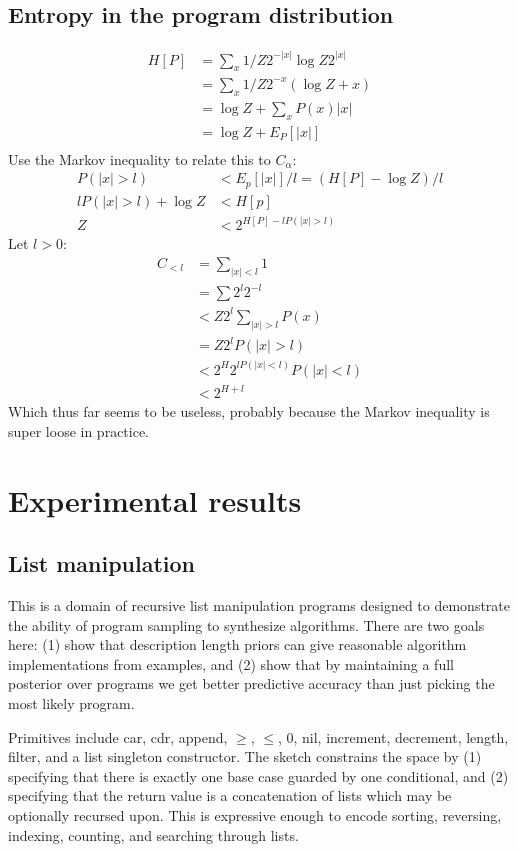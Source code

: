 \documentclass{article}
\begin{document}
\subsection{Entropy in the program distribution}
\begin{align}
  H[P] &=  \sum_x 1/Z2^{-|x|} \log Z2^{|x|}\\
  & = \sum_x 1/Z 2^{-x} (\log Z + x)\\
  & = \log Z + \sum_x P(x)|x|\\
  & = \log Z + E_P[|x|]\\
\end{align}
Use the Markov inequality to relate this to $C_\alpha$:
\begin{align}
  P(|x| > l) & < E_p[|x|]/l = (H[P] - \log Z)/l %
  \\  lP(|x| > l) + \log Z& < H[p]\\
  Z& < 2^{H[P] - lP(|x| > l)}
\end{align}
Let $l > 0$:
\begin{align}
  C_{  <  l}& = \sum_{|x| < l}1\\
  & = \sum 2^l2^{-l}\\
  &   < Z  2^l\sum_{|x| > l}P(x)\\
  & = Z2^lP(|x| > l)\\
  & < 2^H2^{lP(|x|<l)}P(|x|<l)\\
  & < 2^{H+l}
\end{align}
Which thus far seems to be useless, probably because the Markov inequality is super loose in practice.


\section{Experimental results}

\subsection{List manipulation}
This is a domain of recursive list manipulation programs designed to demonstrate the ability of program sampling to synthesize algorithms.
There are two goals here: (1) show that description length priors can give reasonable algorithm implementations from examples, and (2) show that by maintaining a full posterior over programs we get better predictive accuracy than just picking the most likely program.

Primitives include car, cdr, append, $\geq$, $\leq$, $0$, nil, increment, decrement, length, filter, and a list singleton constructor.
The sketch constrains the space by (1) specifying that there is exactly one base case guarded by one conditional, and (2) specifying that the return value is a concatenation of lists which may be optionally recursed upon.
This is expressive enough to encode sorting, reversing, indexing, counting, and searching through lists.
\end{document}

